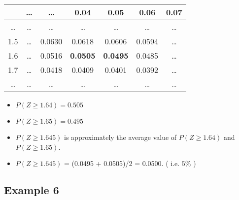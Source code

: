 \documentclass[a4paper,12pt]{article}
\begin{document}
\begin{table}[ht]

\centering %
\begin{tabular}{|c|| c c c c c c|} %
\hline %
& \ldots & \ldots & 0.04 & 0.05 &0.06&0.07 \\
\hline \hline%
\ldots & \ldots &\ldots &\ldots& \ldots &\ldots&\ldots \\ %
1.5 & \ldots & 0.0630&0.0618& 0.0606 &0.0594&\dots \\ %
1.6 & \ldots &0.0516& \textbf{0.0505} & \textbf{0.0495} &0.0485&\ldots\\
1.7 & \ldots &0.0418 &0.0409& 0.0401 &0.0392&\dots \\ %
\ldots & \ldots &\ldots &\ldots& \ldots &\ldots&\ldots \\ %
\hline %
\end{tabular}
\end{table}


\begin{itemize}
\item $ P(Z \geq 1.64) = 0.505$
\item $ P(Z \geq 1.65) = 0.495$ \bigskip
\item $ P(Z \geq 1.645)$ is approximately the average value of $ P(Z \geq 1.64)$ and $ P(Z \geq 1.65)$.
\item $ P(Z \geq 1.645)$ = (0.0495 + 0.0505)/2 = 0.0500. ( i.e. $5\%$ )
\end{itemize}

\newpage

\subsection*{Example 6}
\end{document}
